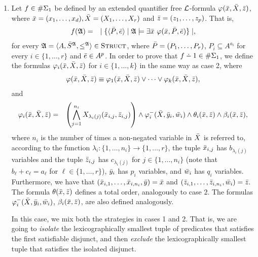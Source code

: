 \begin{enumerate}
	\item Let $f \in \E{1}$ be defined by an extended quantifier free $\L$-formula $\varphi(\x,\X,\z)$, where $\x = (x_1,\dots,x_d), \X = (X_1,\dots,X_r)$ and $\z = (z_1,\dots,z_p)$. That is,
	\begin{eqnarray*}
		f(\A) &=& \mid \{ \langle\P,\e\rangle \mid \A \models \exists \x \ \varphi(\x,\P,\e) \} \mid,
	\end{eqnarray*}
	for every $\A = \langle A, \S^{\A}, \leq^{\A} \rangle \in \str$, where $\P = (P_1,\ldots,P_r)$, $P_i \subseteq A^{a_i}$ for every $i \in \{1,\ldots,r\}$ and $\e \in A^p$. In order to prove that $f\dotminus 1\in\E{1}$, we define the formulas $\varphi_i(\x,\X,\z)$ for $i\in\{1,\ldots,k\}$ in the same way as case 2, where
	\begin{eqnarray*}
		\varphi(\x,\X,\z) \equiv \varphi_1(\x,\X,\z) \vee \cdots \vee \varphi_k(\x,\X,\z),
	\end{eqnarray*}
	and
	\begin{eqnarray*}
		\varphi_i(\x,\X,\z) &=& \left( \bigwedge_{j=1}^{n_i} X_{\lambda_i(j)}(\x_{i,j},\z_{i,j}) \right) \wedge \varphi^{-}_i(\X,\y_i,\w_i) \wedge \theta_i(\x,\z) \wedge \beta_i(\x,\z),
	\end{eqnarray*}
	where $n_i$ is the number of times a non-negated variable in $\X$ is referred to, according to the function $\lambda_i:\{1,\ldots,n_i\}\to\{1,\ldots,r\}$, the tuple $\x_{i,j}$ has $b_{\lambda_i(j)}$ variables and the tuple $\z_{i,j}$ has $c_{\lambda_i(j)}$ for $j\in\{1,\ldots,n_i\}$ (note that $b_{\ell} + c_{\ell} = a_{\ell}$ for $\ell\in\{1,\ldots,r\}$), $\y_i$ has $p_i$ variables, and $\w_i$ has $q_i$ variables. Furthermore, we have that $(\x_{i,1},\ldots,\x_{i,n_i},\y) = \x$ and $(\z_{i,1},\ldots,\z_{i,n_i},\w_i) = \z.$ The formula $\theta(\x,\z)$ defines a total order, analogously to case 2. The formulas $\varphi^{-}_i(\X,\y_i,\w_i)$, $\beta_i(\x,\z)$, are also defined analogously.
	
	In this case, we mix both the strategies in cases 1 and 2. That is, we are going to {\em isolate} the lexicographically smallest tuple of predicates that satisfies the first satisfiable disjunct, and then {\em exclude} the lexicographically smallest tuple that satisfies the isolated disjunct.
	

\end{enumerate}
